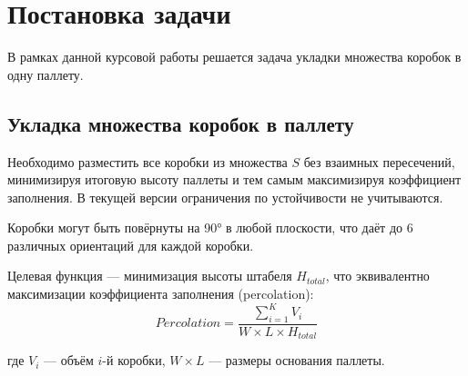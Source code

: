 \chapter{Постановка задачи}
\label{cha:Postanovka}

В рамках данной курсовой работы решается задача укладки множества коробок в одну паллету.

 \section{Укладка множества коробок в паллету}
 Необходимо разместить все коробки из множества $S$ без взаимных пересечений, минимизируя итоговую высоту паллеты и тем самым максимизируя коэффициент заполнения. В текущей версии ограничения по устойчивости не учитываются.

Коробки могут быть повёрнуты на 90° в любой плоскости, что даёт до 6 различных ориентаций для каждой коробки.

Целевая функция --- минимизация высоты штабеля $H_{total}$, что эквивалентно максимизации коэффициента заполнения (percolation):
$$Percolation = \frac{\sum_{i=1}^K V_i}{W \times L \times H_{total}}$$

где $V_i$ --- объём $i$-й коробки, $W \times L$ --- размеры основания паллеты.

%
%  
%  
%
%
%
%
%


  